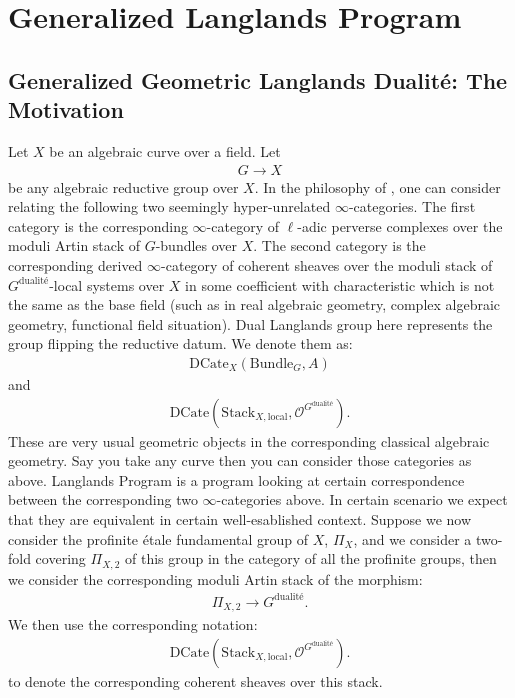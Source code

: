 \documentclass[12pt]{book}
\theoremstyle{definition}
\begin{document}
\newpage
\chapter{Generalized Langlands Program}

\section{Generalized Geometric Langlands Dualit\'e: The Motivation}


\noindent Let $X$ be an algebraic curve over a field. Let 
\begin{align}
G\longrightarrow X
\end{align}
be any algebraic reductive group over $X$. In the philosophy of \cite{La}, one can consider relating the following two seemingly hyper-unrelated $\infty$-categories. The first category is the corresponding $\infty$-category of $\ell$-adic perverse complexes over the moduli Artin stack of $G$-bundles over $X$. The second category is the corresponding derived $\infty$-category of coherent sheaves over the moduli stack of $G^\text{dualit\'e}$-local systems over $X$ in some coefficient with characteristic which is not the same as the base field (such as in real algebraic geometry, complex algebraic geometry, functional field situation). Dual Langlands group here represents the group flipping the reductive datum. We denote them as:
\begin{align}
\mathrm{DCate}_X(\mathrm{Bundle}_G,A)
\end{align}
and
\begin{align}
\mathrm{DCate}(\mathrm{Stack}_{X,\mathrm{local}},\mathcal{O}^{G^\text{dualit\'e}}).
\end{align}
These are very usual geometric objects in the corresponding classical algebraic geometry. Say you take any curve then you can consider those categories as above. Langlands Program is a program looking at certain correspondence between the corresponding two $\infty$-categories above. In certain scenario we expect that they are equivalent in certain well-esablished context. Suppose we now consider the profinite \'etale fundamental group of $X$, $\Pi_X$, and we consider a two-fold covering $\Pi_{X,2}$ of this group in the category of all the profinite groups, then we consider the corresponding moduli Artin stack of the morphism:
\begin{align}
\Pi_{X,2} \rightarrow G^\text{dualit\'e}.
\end{align}
We then use the corresponding notation:
\begin{align}
\mathrm{DCate}(\mathrm{Stack}_{X,\mathrm{local}},\mathcal{O}^{G^\text{dualit\'e}}).
\end{align}
to denote the corresponding coherent sheaves over this stack.
\end{document}
